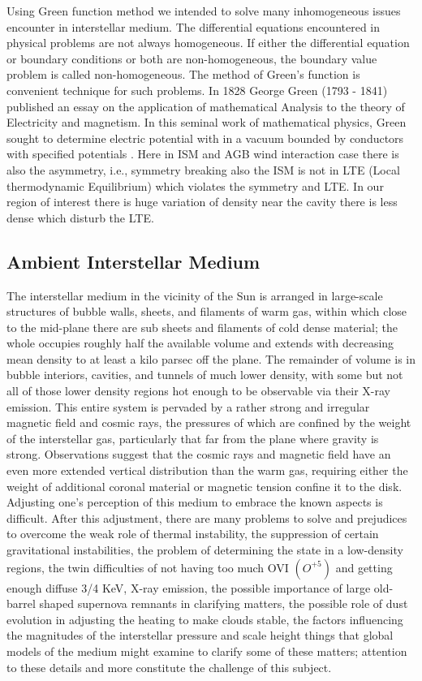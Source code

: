 \documentclass[fleqn,a4paper,12pt,oneside]{article}
\begin{document}
Using Green function method we intended to solve many
inhomogeneous issues encounter in interstellar medium. The
differential equations encountered in physical problems are not
always homogeneous.\cite{14} If either the differential equation
or boundary conditions or both are non-homogeneous, the boundary
value problem is called non-homogeneous. The method of Green's
function is convenient technique for such problems. In 1828 George
Green (1793 - 1841) published an essay on the application of
mathematical Analysis to the theory of Electricity and magnetism.
In this seminal work of mathematical physics, Green sought to
determine electric potential with in a vacuum bounded by
conductors with specified potentials \cite{G}. Here in ISM and AGB
wind interaction case there is also the asymmetry, i.e., symmetry
breaking also the ISM is not in LTE (Local thermodynamic Equilibrium) which violates the symmetry and LTE. In our region
of interest there is huge variation of density near the cavity
there is less dense which disturb the LTE.



\subsection{Ambient Interstellar Medium}
The interstellar medium in the vicinity of the Sun is arranged in
large-scale structures of bubble walls, sheets, and filaments of
warm gas, within which close to the mid-plane there are sub sheets
and filaments of cold dense material; the whole occupies roughly
half the available volume and extends with decreasing mean density
to at least a kilo parsec off the plane. The remainder of volume is in bubble interiors, cavities, and tunnels of much lower
density, with some but not all of those lower density regions hot
enough to be observable via their X-ray emission. This entire
system is pervaded by a rather strong and irregular magnetic field
and cosmic rays, the pressures of which are confined by the weight
of the interstellar gas, particularly that far from the plane
where gravity is strong. Observations suggest that the cosmic rays
and magnetic field have an even more extended vertical
distribution than the warm gas, requiring either the weight of
additional coronal material or magnetic tension  confine it to
the disk. Adjusting one's perception of this medium to embrace the
known aspects is difficult. After this adjustment, there are many
problems to solve and prejudices to overcome the weak role of
thermal instability, the suppression of certain gravitational
instabilities, the problem of determining the state in a
low-density regions, the twin difficulties of not having too much
OVI $(O^{+5})$ and getting enough diffuse 3/4 KeV, X-ray emission,
the possible importance of large old-barrel shaped supernova
remnants in clarifying matters, the possible role of dust
evolution in adjusting the heating to make clouds stable, the
factors influencing the magnitudes of the interstellar pressure
and scale height things that global models of the medium might
examine to clarify some of these matters; attention to these
details and more constitute the challenge of this subject.
\end{document}
